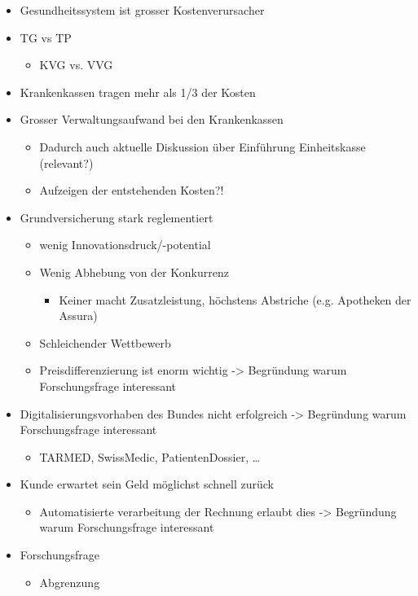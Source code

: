 \documentclass[12pt, twoside, table]{extarticle}
\begin{document}
\begin{itemize}
    \item Gesundheitssystem ist grosser Kostenverursacher
    \item TG vs TP
    \begin{itemize}
         \item KVG vs. VVG
    \end{itemize}
	 \item Krankenkassen tragen mehr als 1/3 der Kosten
	 \item Grosser Verwaltungsaufwand bei den Krankenkassen
     \begin{itemize}
        \item Dadurch auch aktuelle Diskussion über Einführung Einheitskasse (relevant?)
        \item Aufzeigen der entstehenden Kosten?!
    \end{itemize}
	\item Grundversicherung stark reglementiert
    \begin{itemize}
        \item wenig Innovationsdruck/-potential
        \item Wenig Abhebung von der Konkurrenz
        \begin{itemize}
			\item Keiner macht Zusatzleistung, höchstens Abstriche (e.g. Apotheken der Assura)
        \end{itemize}
        \item Schleichender Wettbewerb
        \item Preisdifferenzierung ist enorm wichtig -> Begründung warum Forschungsfrage interessant
    \end{itemize}
	\item Digitalisierungsvorhaben des Bundes nicht erfolgreich -> Begründung warum Forschungsfrage interessant
    \begin{itemize}
        \item TARMED, SwissMedic, PatientenDossier, …
    \end{itemize}
    \item Kunde erwartet sein Geld möglichst schnell zurück
    \begin{itemize}
        \item Automatisierte verarbeitung der Rechnung erlaubt dies  -> Begründung warum Forschungsfrage interessant
    \end{itemize}
    \item Forschungsfrage
    \begin{itemize}
        \item Abgrenzung
    \end{itemize}
\end{itemize}
	
\end{document}
